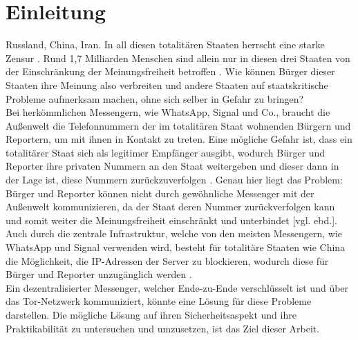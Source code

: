 \documentclass[a4paper,ngerman, headheight=28pt,12pt]{scrartcl}
\newcommand{\vcite}[1]{\cite[vgl.][]{#1}}
\newcommand{\vebd}{[vgl. ebd.]}
\begin{document}

%
\tableofcontents
\setcounter{page}{0}
\thispagestyle{empty}
\vspace{0.5cm}
\pagebreak


\section{Einleitung}
Russland, China, Iran. In all diesen totalitären Staaten herrscht eine starke Zensur \vcite{AmnReport}. Rund 1,7 Milliarden Menschen sind allein nur in diesen drei Staaten von der Einschränkung der Meinungsfreiheit betroffen \vcite{UnPop}. Wie können Bürger dieser Staaten ihre Meinung also verbreiten und andere Staaten auf
staatskritische Probleme aufmerksam machen, ohne sich selber in Gefahr zu bringen?
\\
Bei herkömmlichen Messengern, wie WhatsApp, Signal und Co., braucht die Außenwelt die Telefonnummern der im totalitären Staat wohnenden Bürgern und Reportern, um mit ihnen in Kontakt zu treten. Eine mögliche Gefahr ist, dass ein totalitärer Staat sich als legitimer Empfänger ausgibt, wodurch Bürger und Reporter ihre privaten Nummern an den Staat weitergeben und dieser dann in der Lage ist, diese Nummern zurückzuverfolgen \vcite{LocPolice}.
Genau hier liegt das Problem: Bürger und Reporter können nicht durch gewöhnliche Messenger mit der Außenwelt kommunizieren, da der Staat deren Nummer zurückverfolgen kann und somit weiter die Meinungsfreiheit einschränkt und unterbindet \vebd.
\\
Auch durch die zentrale Infrastruktur, welche von den meisten Messengern, wie WhatsApp und Signal verwenden wird, besteht für totalitäre Staaten wie China die Möglichkeit, die IP-Adressen der Server zu blockieren, wodurch diese für Bürger und Reporter unzugänglich werden \vcite{ChinaFirewall,CentralizedWhatsapp}.
\\
Ein dezentralisierter Messenger, welcher Ende-zu-Ende verschlüsselt ist und über das Tor-Netzwerk kommuniziert, könnte eine Lösung für diese Probleme darstellen. Die mögliche Lösung auf ihren Sicherheitsaspekt und ihre Praktikabilität zu untersuchen und umzusetzen, ist das Ziel dieser Arbeit.
\end{document}
